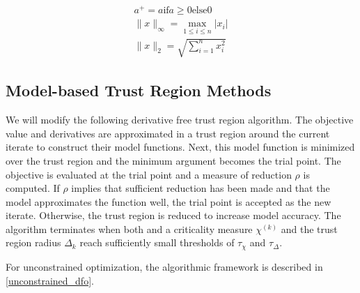 \documentclass{article}
\theoremstyle{case}
\newcommand{\chik}{{\chi^{(k)}}}
\begin{document}
\begin{align*}
a^+ = a \textrm{if} a \ge 0 \textrm{else} 0 \\
\|x\|_{\infty} = \max_{1\le i\le n}|x_i| \\
\|x\|_{2} = \sqrt{\sum_{i=1}^n x_i^2}
\end{align*}

\subsection{Model-based Trust Region Methods}

We will modify the following derivative free trust region algorithm.
The objective value and derivatives are approximated in a trust region around the current iterate to construct their model functions.
Next, this model function is minimized over the trust region and the minimum argument becomes the trial point.
The objective is evaluated at the trial point and a measure of reduction $\rho$ is computed.
If $\rho$ implies that sufficient reduction has been made and that the model approximates the function well, the trial point is accepted as the new iterate.
Otherwise, the trust region is reduced to increase model accuracy.
The algorithm terminates when both and a criticality measure $\chik$ and the trust region radius $\Delta_k$ reach sufficiently small thresholds of $\tau_{\chi}$ and $\tau_{\Delta}$.


For unconstrained optimization, the algorithmic framework is described in \cref{unconstrained_dfo}.
\end{document}
